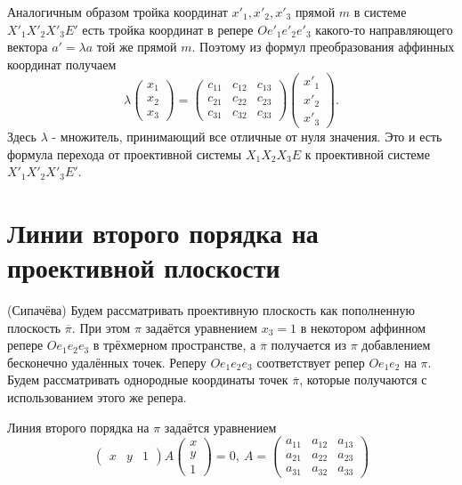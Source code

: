 \documentclass[a4paper, 12pt]{article}
\theoremstyle{definition}
\begin{document}
Аналогичным образом тройка координат $x'_1, x'_2, x'_3$ прямой $m$ в системе $X'_1X'_2X'_3E'$ есть тройка координат в репере $Oe'_1e'_2e'_3$ какого-то направляющего вектора $a' = \lambda a$ той же прямой $m$.
Поэтому из формул преобразования аффинных координат получаем
\[ \lambda \begin{pmatrix}
    x_1 \\ x_2 \\ x_3
\end{pmatrix} = 
\begin{pmatrix} c_{11}&c_{12}&c_{13} \\ c_{21}&c_{22}&c_{23} \\ c_{31}&c_{32}&c_{33} \end{pmatrix}
\begin{pmatrix}
    x'_1 \\ x'_2 \\ x'_3
\end{pmatrix}. \]
Здесь $\lambda$ - множитель, принимающий все отличные от нуля значения. Это и есть формула перехода от проективной системы $X_1X_2X_3E$ к проективной системе $X'_1X'_2X'_3E'$.


\section{Линии второго порядка на проективной плоскости}
(Сипачёва) Будем рассматривать проективную плоскость как пополненную плоскость $\overline{\pi}$.
При этом $\pi$ задаётся уравнением $x_3 = 1$ в некотором аффинном репере $Oe_1e_2e_3$ в трёхмерном пространстве, а $\overline{\pi}$ получается из $\pi$ добавлением бесконечно удалённых точек.
Реперу $Oe_1e_2e_3$ соответствует репер $Oe_1e_2$ на $\pi$.
Будем рассматривать однородные координаты точек $\overline{\pi}$, которые получаются с использованием этого же репера.

Линия второго порядка на $\pi$ задаётся уравнением
\[ \begin{pmatrix} x&y&1 \end{pmatrix} A \begin{pmatrix} x \\ y \\ 1 \end{pmatrix} = 0, \
A = \begin{pmatrix}
    a_{11} & a_{12} & a_{13} \\ a_{21} & a_{22} & a_{23} \\ a_{31} & a_{32} & a_{33}
\end{pmatrix}
\]
\end{document}
